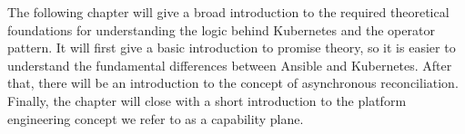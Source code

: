 The following chapter will give a broad introduction to the required theoretical foundations for understanding the logic behind Kubernetes and the operator pattern.
It will first give a basic introduction to promise theory, so it is easier to understand the fundamental differences between Ansible and Kubernetes.
After that, there will be an introduction to the concept of asynchronous reconciliation.
Finally, the chapter will close with a short introduction to the platform engineering concept we refer to as a capability plane.

